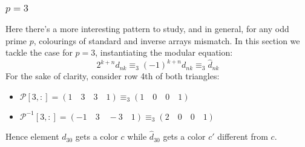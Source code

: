 \documentclass[10pt,a4paper]{article} %
\begin{document}
    \subsubsection{$p=3$}
    Here there's a more interesting pattern to study, and in general,
    for any odd prime $p$, colourings of standard and inverse arrays
    mismatch. In this section we tackle the case for $p=3$,
    instantiating the modular equation:
    \begin{displaymath}
        2^{k+n}d_{nk}\equiv_{3}(-1)^{k+n}d_{nk} \equiv_{3} \hat{d}_{nk}
    \end{displaymath}
    For the sake of clarity, consider row 4th of both triangles:
    \begin{itemize}
        \item $\mathcal{P}[3,:] = (1 \quad 3 \quad 3 \quad 1) \equiv_{3}(1 \quad 0 \quad 0 \quad 1)$
        \item $\mathcal{P}^{-1}[3,:] = (-1 \quad 3 \quad -3 \quad 1) \equiv_{3}(2 \quad 0 \quad 0 \quad 1)$
    \end{itemize}
    Hence element $d_{30}$ gets a color $c$ while $\hat{d}_{30}$ gets a color $c'$ different from $c$.
\end{document}
